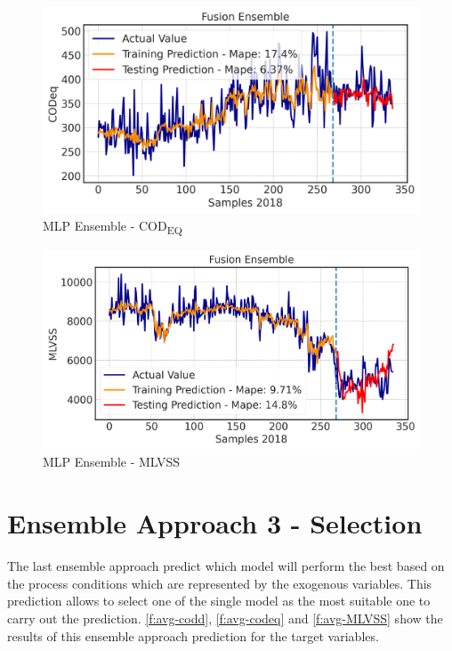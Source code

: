 \begin{figure}[h]
\centering
\includegraphics[width=\linewidth]{figures/Ch5/CODeq-ann.png}
\caption{MLP Ensemble - COD\textsubscript{EQ}}
\label{f:ann-codeq}
\end{figure}

\begin{figure}[h]
\centering
\includegraphics[width=\linewidth]{figures/Ch5/MVLSS-E_ann.png}
\caption{MLP Ensemble - MLVSS}
\label{f:ann-MLVSS}
\end{figure}

\section{Ensemble Approach 3 - Selection}
The last ensemble approach predict which model will perform the best based on the process conditions which are represented by the exogenous variables. This prediction allows to select one of the single model as the most suitable one to carry out the prediction. \autoref{f:avg-codd}, \autoref{f:avg-codeq} and \autoref{f:avg-MLVSS} show the results of this ensemble approach prediction for the target variables. 

